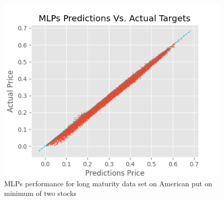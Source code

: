 \begin{figure}[th]
\centering
\includegraphics{Figures/longTAmerMinP.png}
\decoRule
\caption[MLPs Performance for Long Maturity Data Set Bivariate American Contingent Claim]{MLPs performance for long maturity data set on American put on minimum of two stocks}
\label{fig:MLPsAmerMin1}
\end{figure}






